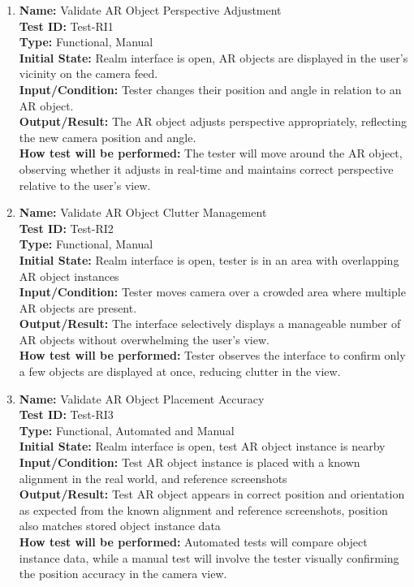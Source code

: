\documentclass[12pt, titlepage]{article}
\begin{document}
\begin{enumerate}


\item \textbf{Name:} Validate AR Object Perspective Adjustment \label{itm:Test-RI1} \\
\textbf{Test ID:} Test-RI1 \\
\textbf{Type:} Functional, Manual \\
\textbf{Initial State:} Realm interface is open, AR objects are displayed in the user’s vicinity on the camera feed. \\
\textbf{Input/Condition:} Tester changes their position and angle in relation to an AR object. \\
\textbf{Output/Result:} The AR object adjusts perspective appropriately, reflecting the new camera position and angle. \\ \textbf{How test will be performed:} The tester will move around the AR object, observing whether it adjusts in real-time and maintains correct perspective relative to the user’s view.

\item \textbf{Name:} Validate AR Object Clutter Management \label{itm:Test-RI2} \\
\textbf{Test ID:} Test-RI2 \\
\textbf{Type:} Functional, Manual \\
\textbf{Initial State:} Realm interface is open, tester is in an area with overlapping AR object instances \\
\textbf{Input/Condition:} Tester moves camera over a crowded area where multiple AR objects are present. \\
\textbf{Output/Result:} The interface selectively displays a manageable number of AR objects without overwhelming the user’s view. \\ \textbf{How test will be performed:} Tester observes the interface to confirm only a few objects are displayed at once, reducing clutter in the view.

\item \textbf{Name:} Validate AR Object Placement Accuracy \label{itm:Test-RI3} \\
\textbf{Test ID:} Test-RI3 \\
\textbf{Type:} Functional, Automated and Manual \\
\textbf{Initial State:} Realm interface is open, test AR object instance is nearby \\
\textbf{Input/Condition:} Test AR object instance is placed with a known alignment in the real world, and reference screenshots \\
\textbf{Output/Result:} Test AR object appears in correct position and orientation as expected from the known alignment and reference screenshots, position also matches stored object instance data \\
\textbf{How test will be performed:} Automated tests will compare object instance data, while a manual test will involve the tester visually confirming the position accuracy in the camera view.



\end{enumerate}
\end{document}
